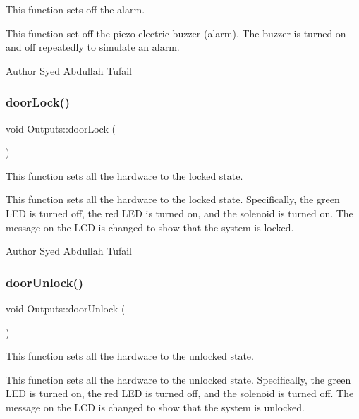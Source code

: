 This function sets off the alarm. 

This function set off the piezo electric buzzer (alarm). The buzzer is turned on and off repeatedly to simulate an alarm.

\begin{DoxyAuthor}{Author}
Syed Abdullah Tufail 
\end{DoxyAuthor}
\mbox{\label{classOutputs_a7f65875e7cbaf23acdd6c003726505fd}} 
\subsubsection{\texorpdfstring{door\+Lock()}{doorLock()}}
{\footnotesize\ttfamily void Outputs\+::door\+Lock (\begin{DoxyParamCaption}{ }\end{DoxyParamCaption})\hspace{0.3cm}{\ttfamily [private]}}



This function sets all the hardware to the locked state. 

This function sets all the hardware to the locked state. Specifically, the green L\+ED is turned off, the red L\+ED is turned on, and the solenoid is turned on. The message on the L\+CD is changed to show that the system is locked.

\begin{DoxyAuthor}{Author}
Syed Abdullah Tufail 
\end{DoxyAuthor}
\mbox{\label{classOutputs_ad29c1e1eda4267feb3ffa7c41a5190c5}} 
\subsubsection{\texorpdfstring{door\+Unlock()}{doorUnlock()}}
{\footnotesize\ttfamily void Outputs\+::door\+Unlock (\begin{DoxyParamCaption}{ }\end{DoxyParamCaption})\hspace{0.3cm}{\ttfamily [private]}}



This function sets all the hardware to the unlocked state. 

This function sets all the hardware to the unlocked state. Specifically, the green L\+ED is turned on, the red L\+ED is turned off, and the solenoid is turned off. The message on the L\+CD is changed to show that the system is unlocked.

